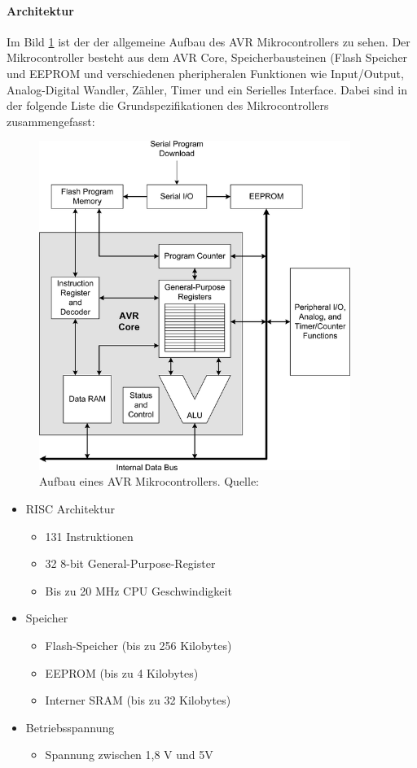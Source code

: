 \paragraph{Architektur}
Im Bild \ref{img:aufbauMikrocontroller} ist der der allgemeine Aufbau des AVR Mikrocontrollers zu sehen. Der Mikrocontroller besteht aus dem AVR Core, Speicherbausteinen (Flash Speicher und EEPROM und verschiedenen  pheripheralen Funktionen wie Input/Output, Analog-Digital Wandler, Zähler, Timer und ein Serielles Interface. Dabei sind in der folgende Liste die Grundspezifikationen des Mikrocontrollers zusammengefasst:
\begin{figure}
	\centering
	\includegraphics[width=0.9\textwidth]{bilder/aufbauMikrocontroller.png}
	\caption[Aufbau eines AVR Mikrocontrollers]{Aufbau eines AVR Mikrocontrollers. Quelle:\cite{hughes2016arduino}}
	\label{img:aufbauMikrocontroller}
\end{figure}
\begin{itemize}
\item RISC Architektur
\begin{itemize}
\item 131 Instruktionen
\item 32 8-bit General-Purpose-Register
\item Bis zu 20 MHz CPU Geschwindigkeit
\end{itemize}
\item Speicher
\begin{itemize}
\item Flash-Speicher (bis zu 256 Kilobytes)
\item EEPROM (bis zu 4 Kilobytes)
\item Interner SRAM (bis zu 32 Kilobytes)
\end{itemize}
\item Betriebsspannung
\begin{itemize}
\item Spannung zwischen 1,8 V und 5V
\end{itemize}
\end{itemize}
